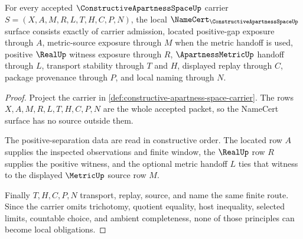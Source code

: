 \begin{theorem}
\label{thm:constructive-apartness-space-namecert-obligations}
For every accepted $\ConstructiveApartnessSpaceUp$ carrier $S=(X,A,M,R,L,T,H,C,P,N)$, the local $\NameCert_{\ConstructiveApartnessSpaceUp}$ surface consists exactly of carrier admission, located positive-gap exposure through $A$, metric-source exposure through $M$ when the metric handoff is used, positive $\RealUp$ witness exposure through $R$, $\ApartnessMetricUp$ handoff through $L$, transport stability through $T$ and $H$, displayed replay through $C$, package provenance through $P$, and local naming through $N$.
\end{theorem}
\begin{proof}
Project the carrier in \autoref{def:constructive-apartness-space-carrier}. The rows $X,A,M,R,L,T,H,C,P,N$ are the whole accepted packet, so the NameCert surface has no source outside them.

The positive-separation data are read in constructive order. The located row $A$ supplies the inspected observations and finite window, the $\RealUp$ row $R$ supplies the positive witness, and the optional metric handoff $L$ ties that witness to the displayed $\MetricUp$ source row $M$.

Finally $T,H,C,P,N$ transport, replay, source, and name the same finite route. Since the carrier omits trichotomy, quotient equality, host inequality, selected limits, countable choice, and ambient completeness, none of those principles can become local obligations.
\end{proof}

